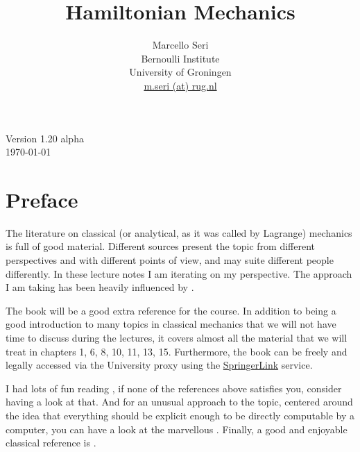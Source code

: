 \documentclass[english,fontsize=11pt,paper=b5]{scrbook}
\title{Hamiltonian Mechanics}
\author{Marcello Seri\\
  \small{Bernoulli Institute}\vspace{-.2cm}\\
  \small{University of Groningen}\vspace{-.2cm}\\
  \small\href{mailto:m.seri@rug.nl}{m.seri (at) rug.nl}
}
\date{}
\theoremstyle{definition}
\begin{document}
\maketitle

\cleardoublepage

\thispagestyle{empty}
\null\vfill
\begin{center}
  Version 1.20 alpha\\
  \today
\end{center}
\begin{warpprint}
  \vfill
  \small{\doclicenseThis}
\end{warpprint}
\cleardoublepage

\tableofcontents

\cleardoublepage

\chapter*{Preface}

The literature on classical (or analytical, as it was called by Lagrange) mechanics is full of good material.
Different sources present the topic from different perspectives and with different points of view, and may suite different people differently.
In these lecture notes I am iterating on my perspective.
The approach I am taking has been heavily influenced by \cite{book:arnold, book:knauf, lectures:dubrovin, book:lowenstein, book:marsdenratiu, lectures:tong, landau1976mechanics}.

The book \cite{book:knauf} will be a good extra reference for the course. In addition to being a good introduction to many topics in classical mechanics that we will not have time to discuss during the lectures, it covers almost all the material that we will treat in chapters 1, 6, 8, 10, 11, 13, 15. Furthermore, the book can be freely and legally accessed via the University proxy using the \href{https://link.springer.com/book/10.1007%2F978-3-662-55774-7}{SpringerLink} service.

  I had lots of fun reading \cite{schwichtenberg2019no}, if none of the references above satisfies you, consider having a look at that. And for an unusual approach to the topic, centered around the idea that everything should be explicit enough to be directly computable by a computer, you can have a look at the marvellous \cite{book:sicm}. Finally, a good and enjoyable classical reference is \cite{goldstein2013classical}.\medskip
\end{document}
